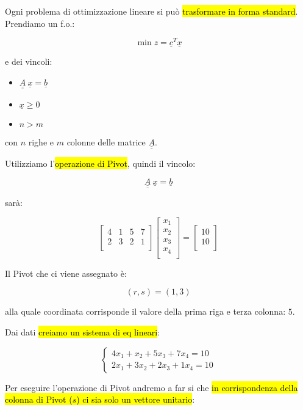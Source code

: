 Ogni problema di ottimizzazione lineare si può \hl{trasformare in forma standard}. Prendiamo un f.o.:

$$\min z = \underline{c}^T \underline{x}$$

e dei vincoli:

\begin{itemize}
	\item $\underline{\underline{A}}\ \underline{x} = \underline{b}$
	\item $\underline{x} \geq 0$
	\item $n > m$
\end{itemize}

con $n$ righe e $m$ colonne delle matrice $\underline{\underline{A}}$.

Utilizziamo l'\hl{operazione di Pivot}, quindi il vincolo:

$$\underline{\underline{A}}\ \underline{x} = \underline{b}$$

sarà:


$$
\left[ {\begin{array}{cccc}
	4 & 1 & 5 & 7 \\
	2 & 3 & 2 & 1 \\
\end{array} } \right]
\left[ {\begin{array}{c}
	x_1 \\
	x_2 \\
	x_3 \\
	x_4 \\
\end{array} } \right]
=
\left[ {\begin{array}{c}
	10 \\
	10 \\
\end{array} } \right]
$$

Il Pivot che ci viene assegnato è:

$$(r, s) = (1, 3)$$

alla quale coordinata corrisponde il valore della prima riga e terza colonna: $5$.

Dai dati \hl{creiamo un sistema di eq lineari}:

$$
\begin{cases} 
    4x_1 + x_2 + 5x_3 + 7x_4 = 10 \\ 
    2x_1 + 3x_2 + 2x_3 + 1x_4 = 10 
\end{cases}
$$

Per eseguire l'operazione di Pivot andremo a far si che \hl{in corrispondenza della colonna di Pivot ($s$) ci sia solo un vettore unitario}:

